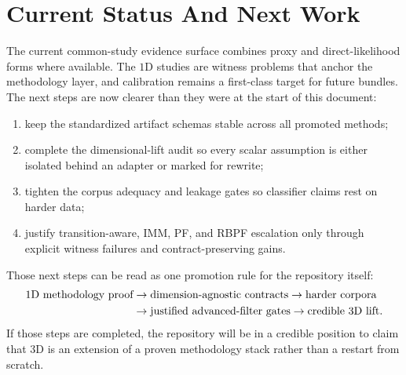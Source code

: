 \documentclass[11pt]{article}
\begin{document}
\section{Current Status And Next Work}
The current common-study evidence surface combines proxy and direct-likelihood
forms where available. The \(1\text{D}\) studies are witness problems that
anchor the methodology layer, and calibration remains a first-class target for
future bundles. The next steps are now clearer than they were at the start of
this document:
\begin{enumerate}[leftmargin=1.5em]
  \item keep the standardized artifact schemas stable across all promoted methods;
  \item complete the dimensional-lift audit so every scalar assumption is either isolated behind an adapter or marked for rewrite;
  \item tighten the corpus adequacy and leakage gates so classifier claims rest on harder data;
  \item justify transition-aware, IMM, PF, and RBPF escalation only through explicit witness failures and contract-preserving gains.
\end{enumerate}
Those next steps can be read as one promotion rule for the repository itself:
\begin{align}
\text{1D methodology proof}
&\rightarrow
\text{dimension-agnostic contracts}
\rightarrow
\text{harder corpora}
\notag \\
&\rightarrow
\text{justified advanced-filter gates}
\rightarrow
\text{credible 3D lift}.
\end{align}
If those steps are completed, the repository will be in a credible position to
claim that \(3\text{D}\) is an extension of a proven methodology stack rather
than a restart from scratch.
\end{document}
